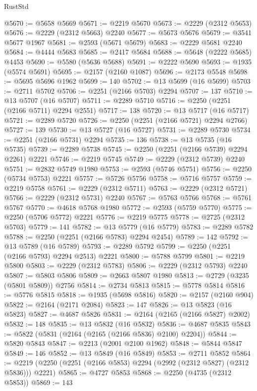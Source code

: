 \begin{lexlean}{RustStd}
\begin{coremodule}
@5670 := @5658 @5669
@5671 := @2219 @5670
@5673 := @2229 (@2312 @5653)
@5676 := @2229 (@2312 @5663) @2240
@5677 := @5673 @5676
@5679 := @3541 @5677 @1967
@5681 := @2593 (@5671 @5679)
@5683 := @2229 @5681 @2240
@5684 := @4444 @5683
@5685 := @2417 @5684
@5688 := @5648 (@2222 @5685) @4453
@5690 := @5580 (@5636 @5688)
@5691 := @2222 @5690
@5693 := @1935 (@5574 @5691)
@5695 := @2157 (@2160 @1087)
@5696 := @2173 @5548
@5698 := @5695 @5696 @1962
@5699 := 140
@5702 := @13 @5699 (@16 @5699)
@5703 := @2711 @5702
@5706 := @2251 (@2166 @5703) @2294
@5707 := 137
@5710 := @13 @5707 (@16 @5707)
@5711 := @2289 @5710
@5716 := @2250 (@2251 (@2166 @5711) @2294 @2551)
@5717 := 138
@5720 := @13 @5717 (@16 @5717)
@5721 := @2289 @5720
@5726 := @2250 (@2251 (@2166 @5721) @2294 @2766)
@5727 := 139
@5730 := @13 @5727 (@16 @5727)
@5731 := @2289 @5730
@5734 := @2251 (@2166 @5731) @2294
@5735 := 136
@5738 := @13 @5735 (@16 @5735)
@5739 := @2289 @5738
@5745 := @2250 (@2251 (@2166 @5739) @2294 @2261) @2221
@5746 := @2219 @5745
@5749 := @2229 (@2312 @5739) @2240
@5751 := @2832 @5749 @1980
@5753 := @2593 (@5746 @5751)
@5756 := @2250 (@5734 @5753) @2221
@5757 := @5726 @5756
@5758 := @5716 @5757
@5759 := @2219 @5758
@5761 := @2229 (@2312 @5711)
@5763 := @2229 (@2312 @5721)
@5766 := @2229 (@2312 @5731) @2240
@5767 := @5763 @5766
@5768 := @5761 @5767
@5770 := @4618 @5768 @1980
@5772 := @2593 (@5759 @5770)
@5775 := @2250 (@5706 @5772) @2221
@5776 := @2219 @5775
@5778 := @2725 (@2312 @5703)
@5779 := 141
@5782 := @13 @5779 (@16 @5779)
@5783 := @2289 @5782
@5788 := @2250 (@2251 (@2166 @5783) @2294 @2454)
@5789 := 142
@5792 := @13 @5789 (@16 @5789)
@5793 := @2289 @5792
@5799 := @2250 (@2251 (@2166 @5793) @2294 @2513) @2221
@5800 := @5788 @5799
@5801 := @2219 @5800
@5803 := @2229 (@2312 @5783)
@5806 := @2229 (@2312 @5793) @2240
@5807 := @5803 @5806
@5809 := @2663 @5807 @1980
@5813 := @2729 (@3235 (@5801 @5809)) @2756
@5814 := @2734 @5813
@5815 := @5778 @5814
@5816 := @5776 @5815
@5818 := @1935 (@5698 @5816)
@5820 := @2157 (@2160 @904)
@5822 := @2164 (@2171 @2084)
@5823 := 147
@5826 := @13 @5823 (@16 @5823)
@5827 := @4687 @5826
@5831 := @2164 (@2165 (@2166 @5827) @2002)
@5832 := 148
@5835 := @13 @5832 (@16 @5832)
@5836 := @4687 @5835
@5843 := @5822 (@5831 (@2164 (@2165 (@2166 @5836) @2100) @2204))
@5844 := @5820 @5843
@5847 := @2213 (@2001 @2100 @1962)
@5848 := @5844 @5847
@5849 := 146
@5852 := @13 @5849 (@16 @5849)
@5853 := @2711 @5852
@5864 := @2219 (@2250 (@2251 (@2166 @5853) @2294 (@2992 (@2312 @5827) (@2312 @5836))) @2221)
@5865 := @4727 @5853
@5868 := @2250 (@4735 (@2312 @5853))
@5869 := 143

\end{coremodule}
\end{lexlean}

